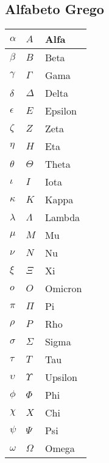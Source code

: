 \subsection{Alfabeto Grego}
    \begin{center}
        \begin{longtable}{| m{3cm} | m{3cm} | m{8.57cm} |}
            \hline $ \alpha $ & $ A $ & Alfa\\
            \hline $ \beta $ & $ B $ & Beta\\
            \hline $ \gamma $ & $ \Gamma $ & Gama\\
            \hline $ \delta $ & $ \Delta $ & Delta\\
            \hline $ \epsilon $ & $ E $ & Epsilon\\
            \hline $ \zeta $ & $ Z $ & Zeta\\
            \hline $ \eta $ & $ H $ & Eta\\
            \hline $ \theta $ & $ \Theta $ & Theta\\
            \hline $ \iota $ & $ I $ & Iota\\
            \hline $ \kappa $ & $ K $ & Kappa\\
            \hline $ \lambda $ & $ \Lambda $ & Lambda\\
            \hline $ \mu $ & $ M $ & Mu\\
            \hline $ \nu $ & $ N $ & Nu\\
            \hline $ \xi $ & $ \Xi $ & Xi\\
            \hline $ o $ & $ O $ & Omicron\\
            \hline $ \pi $ & $ \Pi $ & Pi\\
            \hline $ \rho $ & $ P $ & Rho\\
            \hline $ \sigma $ & $ \Sigma $ & Sigma\\
            \hline $ \tau $ & $ T $ & Tau\\
            \hline $ \upsilon $ & $ \Upsilon $ & Upsilon\\
            \hline $ \phi $ & $ \Phi $ & Phi\\
            \hline $ \chi $ & $ X $ & Chi\\
            \hline $ \psi $ & $ \Psi $ & Psi\\
            \hline $ \omega $ & $ \Omega $ & Omega\\
            \hline
        \end{longtable}
    \end{center}